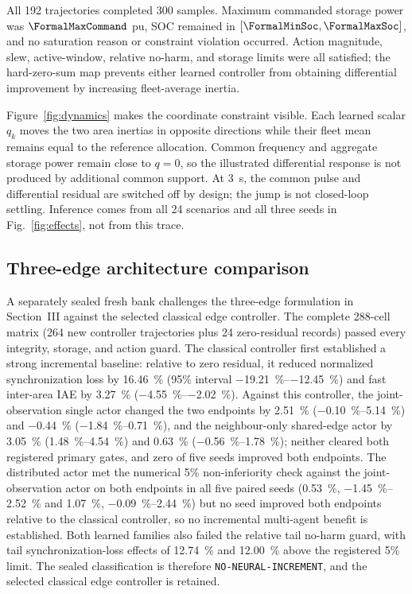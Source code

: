 \documentclass[conference,a4paper]{IEEEtran}
\begin{document}
All 192 trajectories completed 300 samples. Maximum commanded storage power was
\(\FormalMaxCommand\) pu, SOC remained in
\([\FormalMinSoc,\FormalMaxSoc]\), and no saturation reason or constraint
violation occurred. Action magnitude, slew, active-window, relative no-harm,
and storage limits were all satisfied; the hard-zero-sum map prevents either
learned controller from obtaining differential improvement by increasing
fleet-average inertia.

Figure~\ref{fig:dynamics} makes the coordinate constraint visible. Each learned
scalar \(q_k\) moves the two area inertias in opposite directions while their
fleet mean remains equal to the reference allocation. Common frequency and
aggregate storage power remain close to \(q=0\), so the illustrated
differential response is not produced by additional common support. At
\SI{3}{s}, the common pulse and differential residual are switched off by
design; the jump is not closed-loop settling. Inference comes from all 24
scenarios and all three seeds in Fig.~\ref{fig:effects}, not from this trace.

\subsection{Three-edge architecture comparison}

A separately sealed fresh bank challenges the three-edge formulation in
Section~III against the selected classical edge controller. The complete
288-cell matrix (264 new controller trajectories plus 24 zero-residual
records) passed every integrity, storage, and action guard. The classical
controller first established a strong incremental baseline: relative to zero
residual, it reduced normalized synchronization loss by \SI{16.46}{\percent}
(95\% interval \SIrange{-19.21}{-12.45}{\percent}) and fast inter-area IAE by
\SI{3.27}{\percent} (\SIrange{-4.55}{-2.02}{\percent}). Against this
controller, the joint-observation single actor changed the two endpoints by
\SI{+2.51}{\percent} (\SIrange{-0.10}{+5.14}{\percent}) and
\SI{-0.44}{\percent} (\SIrange{-1.84}{+0.71}{\percent}), and the
neighbour-only shared-edge actor by \SI{+3.05}{\percent}
(\SIrange{+1.48}{+4.54}{\percent}) and \SI{+0.63}{\percent}
(\SIrange{-0.56}{+1.78}{\percent}); neither cleared both registered primary
gates, and zero of five seeds improved both endpoints. The distributed actor
met the numerical 5\% non-inferiority check against the joint-observation
actor on both endpoints in all five paired seeds (\SI{+0.53}{\percent},
\SIrange{-1.45}{+2.52}{\percent} and \SI{+1.07}{\percent},
\SIrange{-0.09}{+2.44}{\percent}) but no seed improved both endpoints
relative to the classical controller, so no incremental multi-agent benefit
is established. Both learned families also failed the relative tail no-harm
guard, with tail synchronization-loss effects of \SI{+12.74}{\percent} and
\SI{+12.00}{\percent} above the registered 5\% limit. The sealed
classification is therefore \texttt{NO-NEURAL-INCREMENT}, and the selected
classical edge controller is retained.
\end{document}
